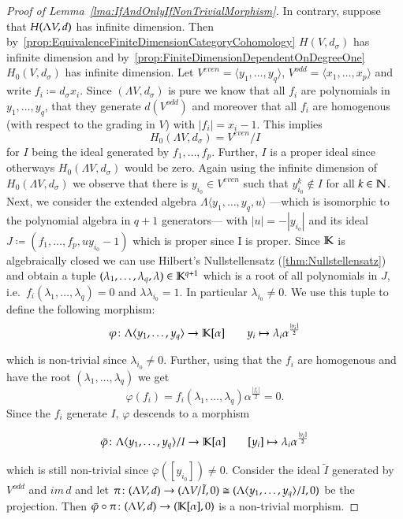 \begin{proof}[Proof of Lemma~\ref{lma:IfAndOnlyIfNonTrivialMorphism}]
  In contrary, suppose that $H(\Lambda V,d)$ has infinite dimension. Then by~\ref{prop:EquivalenceFiniteDimensionCategoryCohomology}
 $H(V, d_{\sigma})$ has infinite dimension and by~\ref{prop:FiniteDimensionDependentOnDegreeOne} $H_0(V, d_{\sigma})$ has
  infinite dimension. Let ${V^{even} = \langle y_1, \ldots , y_q \rangle}$,
  ${V^{odd} = \langle x_1 , \ldots , x_p \rangle}$ and write
  $f_i \coloneqq d_{\sigma} x_i$. Since $(\Lambda V, d_{\sigma})$ is pure we know that all $f_i$ are 
  polynomials in $y_1, \ldots , y_q$, that they generate $d(V^{odd})$ and moreover that all $f_i$ are homogenous (with
  respect to the grading in $V$)
  with $|f_i| = x_i -1$. This implies 
  $$H_0(\Lambda V,d_{\sigma}) = V^{even} / I$$
  for $I$ being the ideal generated by $f_1, \ldots, f_p$. Further, $I$  is a proper ideal since otherways
  $H_0(\Lambda V,d_{\sigma})$ would be zero. Again using the infinite dimension of 
  $H_0(\Lambda V,d_{\sigma})$ we observe that there is $y_{i_0} \in V^{even}$  such that
  $y_{i_0}^k \notin I$ for all $k \in \mathbb{N}$. Next, we consider the extended algebra 
  $\Lambda \langle y_1, \ldots, y_q, u \rangle$ ---which is isomorphic to the polynomial algebra in $q+1$ generators---
  with $|u| = - |y_{i_o}|$ and its ideal 
  $J \coloneqq (f_1, \ldots, f_p, u y_{i_0} - 1)$ which is proper since I is proper.
  Since $\mathbb{K}$ is algebraically closed we can use Hilbert's Nullstellensatz (\ref{thm:Nullstellensatz}) and obtain a tuple 
  $(\lambda_1, \ldots, \lambda_q, \lambda) \in \mathbb{K}^{q+1}$ which is a root of all polynomials in $J$,
  i.e.\ $f_i(\lambda_1, \ldots, \lambda_q) = 0$ and $\lambda \lambda_{i_0} = 1$. In particular 
  $\lambda_{i_0} \neq 0$. We use this tuple to define the following morphism:
  $$ \varphi \colon  \Lambda \langle y_1, \ldots, y_q \rangle \to \mathbb{K}[\alpha]
  \qquad y_i \mapsto \lambda_i \alpha^{\frac{|y_i]}{2}}$$
  
  which is non-trivial since $\lambda_{i_0} \neq 0$. Further, using that the $f_i$ are homogenous 
  and have the root $(\lambda_1, \ldots , \lambda_q)$ we get 
  $$\varphi(f_i) = f_i(\lambda_1, \ldots , \lambda_q) \alpha^{\frac{|f_i|}{2}} = 0. $$
  Since the $f_i$ generate $I$,  $\varphi$ descends to a morphism
  
  $$ \bar{\varphi} \colon  \Lambda \langle y_1, \ldots, y_q \rangle/I \to \mathbb{K}[\alpha]
   \qquad [y_i] \mapsto \lambda_i \alpha^{\frac{|y_i]}{2}}$$
  
  which is still non-trivial since $\bar{\varphi} ( [y_{i_0}]) \neq 0$.
  Consider the ideal $\tilde{I}$ generated by 
  $V^{odd}$ and $im \, d$ and let $\pi \colon (\Lambda V,d) \to (\Lambda V / \tilde{I} , 0) 
  \cong (\Lambda \langle y_1, \ldots, y_q \rangle/I,0)$ be the projection. Then 
  ${ \bar{\varphi} \circ \pi \colon (\Lambda V,d) \to (\mathbb{K}[\alpha], 0)}$ is a non-trivial morphism.
 \end{proof}
 
